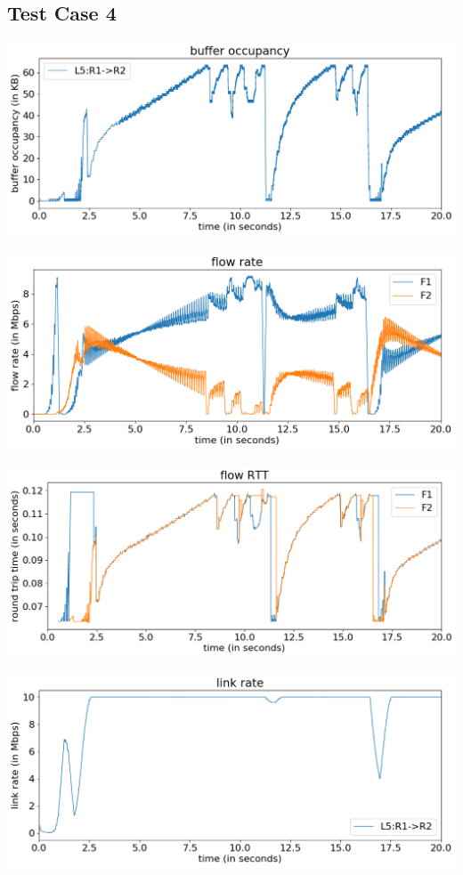 \documentclass{article}
\begin{document}
\subsection{Test Case 4}


\includegraphics[width = \textwidth]{"test_case4 buffer occupancy"}

\includegraphics[width = \textwidth]{"test_case4 flow rate"}

\includegraphics[width = \textwidth]{"test_case4 flow RTT"}

\includegraphics[width = \textwidth]{"test_case4 link rate"}
\end{document}
